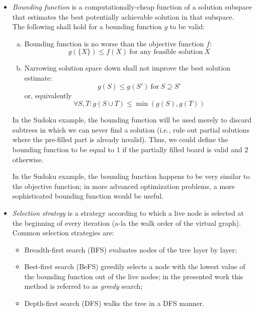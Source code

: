 \begin{itemize}
    \item \emph{Bounding function} is a computationally-cheap function of a solution subspace
        that estimates the best potentially achievable solution in that
        subspace. \\
        The following shall hold for a bounding function $g$ to be valid:
        \begin{enumerate}[(a)]
            \item Bounding function is no worse than the objective function $f$:
                \[
                g(\{X\}) \leq f(X) \:\text{for any feasible solution}\: X
                \]
            \item Narrowing solution space down shall not improve the best solution estimate:
                \[
                g(S) \leq g(S') \:\text{for}\: S \supseteq S'
                \]
                or, equivalently
                \[
                \forall S, T: g(S \cup T) \leq \min(g(S), g(T))
                \]
        \end{enumerate}

        In the Sudoku example, the bounding function will be used merely to discard subtrees
        in which we can never find a solution (i.e., rule out partial solutions where the
        pre-filled part is already invalid). Thus, we could define
        the bounding function to be equal to $1$ if the partially filled board is valid and $2$
        otherwise.

        In the Sudoku example, the bounding function happens to be very similar to the objective
        function; in more advanced optimization problems, a more sophisticated bounding
        function would be useful.

    \item \emph{Selection strategy} is a strategy according to which a live node is selected
        at the beginning of every iteration (a-la the walk order of the virtual graph). \\
        Common selection strategies are:
        \begin{itemize}
            \item Breadth-first search (BFS) evaluates nodes of the tree layer by layer;
            \item Best-first search (BeFS) greedily selects a node with the lowest value of the
                bounding function out of the live nodes; in the presented work this method
                is referred to as \emph{greedy} search;
            \item Depth-first search (DFS) walks the tree in a DFS manner.
        \end{itemize}


\end{itemize}
